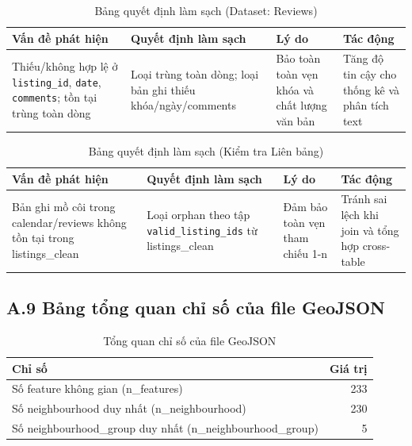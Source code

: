 \begin{table}[H]
\centering
\caption{Bảng quyết định làm sạch (Dataset: Reviews)}\label{tab:A8-reviews}
\small
\renewcommand{\arraystretch}{1.3}
\begin{tabularx}{\textwidth}{|>{\raggedright\arraybackslash}X|>{\raggedright\arraybackslash}X|>{\raggedright\arraybackslash}X|>{\raggedright\arraybackslash}X|}
\hline
\textbf{Vấn đề phát hiện} & \textbf{Quyết định làm sạch} & \textbf{Lý do} & \textbf{Tác động} \\
\hline
Thiếu/không hợp lệ ở \texttt{listing\_id}, \texttt{date}, \texttt{comments}; tồn tại trùng toàn dòng & Loại trùng toàn dòng; loại bản ghi thiếu khóa/ngày/comments & Bảo toàn toàn vẹn khóa và chất lượng văn bản & Tăng độ tin cậy cho thống kê và phân tích text \\
\hline
\end{tabularx}
\end{table}

\begin{table}[H]
\centering
\caption{Bảng quyết định làm sạch (Kiểm tra Liên bảng)}\label{tab:A8-cross}
\small
\renewcommand{\arraystretch}{1.3}
\begin{tabularx}{\textwidth}{|>{\raggedright\arraybackslash}X|>{\raggedright\arraybackslash}X|>{\raggedright\arraybackslash}X|>{\raggedright\arraybackslash}X|}
\hline
\textbf{Vấn đề phát hiện} & \textbf{Quyết định làm sạch} & \textbf{Lý do} & \textbf{Tác động} \\
\hline
Bản ghi mồ côi trong calendar/reviews không tồn tại trong listings\_clean & Loại orphan theo tập \texttt{valid\_listing\_ids} từ listings\_clean & Đảm bảo toàn vẹn tham chiếu 1-n & Tránh sai lệch khi join và tổng hợp cross-table \\
\hline
\end{tabularx}
\end{table}

\subsection*{A.9 Bảng tổng quan chỉ số của file GeoJSON}

\begin{table}[H]
\centering
\caption{Tổng quan chỉ số của file GeoJSON}\label{tab:A9}
\begin{tabular}{|l|r|}
\hline
\textbf{Chỉ số} & \textbf{Giá trị} \\
\hline
Số feature không gian (n\_features)              & 233 \\
Số neighbourhood duy nhất (n\_neighbourhood)     & 230 \\
Số neighbourhood\_group duy nhất (n\_neighbourhood\_group) & 5 \\
\hline
\end{tabular}
\end{table}


